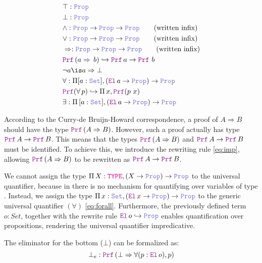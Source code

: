 \begin{definition}
\begin{align}
& \top \index{$\top$} : \prop \\
& \bot \index{$\bot$} : \prop \\
& \land \index{$\land$}: \prop \ra \prop \ra \prop \qquad \text{(written inﬁx)} \\
& \lor \index{$\lor$}: \prop \ra \prop \ra \prop \qquad \text{(written inﬁx)} \\
& \Rightarrow \index{$\Rightarrow$}: \prop \ra \prop \ra \prop \qquad \text{(written inﬁx)} \\
&  \prf\,(a \Rightarrow\,b) \re \prf\, a \ra \prf\,\,b \label{eq:imp}\\
& \neg a \is a \Rightarrow \bot \index{$\neg$} \\
& \forall \index{$\forall$}: \Pi {[a: \set]}, (\el\, a \ra \prop) \ra \prop \label{eq:forall}\\
& \prf{}(\forall\,p) \re \Pi\, x, \prf{(p~x)}\\
& \exists \index{$\exists$}: \Pi\, {[a: \set]}, (\el\, a \ra \prop) \ra \prop
\end{align}
\end{definition}

According to the Curry-de Bruijn-Howard correspondence, a proof of $A \Rightarrow B$ should have the type $\prf\,(A \Rightarrow B)$.
However, such a proof actually has type $\prf\,A \ra \prf\,B$. This means that the types $\prf\,(A \Rightarrow B)$ and $\prf\,A \ra \prf\,B$ must be identiﬁed.
To achieve this, we introduce the rewriting rule \cref{eq:imp}, allowing $\prf\,(A \Rightarrow B)$ to be rewritten as $\prf\,A \ra \prf\,B$.

We cannot assign the type $\Pi\,X: \type, (X \ra \prop) \ra \prop$ to the universal quantifier, because in \lpm{} there is no mechanism for quantifying over variables of type \type.
Instead, we assign the type $\Pi\,x:\set{},(\el\,x \ra \prop) \ra \prop$ to the generic universal quantiﬁer $(\forall)$ \cref{eq:forall}.
Furthermore, the previously defined term $o: Set$, together with the rewrite rule $\el\,o\index{o} \hookrightarrow \prop$ enables quantification over propositions, rendering the universal quantifier impredicative.

\begin{example}
The eliminator for the bottom ($\bot$) can be formalized as:
\[ \bot_e : \prf\,(\bot \Rightarrow \forall (p: \el\,o), p) \]
\end{example}

